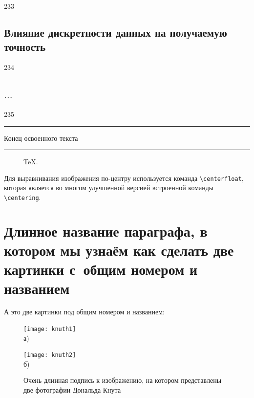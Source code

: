 233



\subsection{Влияние дискретности данных на получаемую точность}\label{subsec:ch2/sec3/sub4}

234



\subsection{$\ldots$}\label{subsec:ch2/sec3/sub5}

235


















\vfill
\noindent\rule{\textwidth}{.1pt}
\begin{center}				Конец освоенного текста					\end{center}
\noindent\rule{\textwidth}{1pt}
\newpage
\newpage



\begin{figure}[ht]
    \caption{TeX.}\label{fig:latex}
\end{figure}

Для выравнивания изображения по-центру используется команда \verb+\centerfloat+, которая является во
многом улучшенной версией встроенной команды \verb+\centering+.

\section{Длинное название параграфа, в котором мы узнаём как сделать две картинки с~общим номером и названием}\label{sec:ch2/sect2}

А это две картинки под общим номером и названием:
\begin{figure}[ht]
    \begin{minipage}[b][][b]{0.49\linewidth}\centering
        \texttt{[image: knuth1]} \\ а)
    \end{minipage}
    \hfill
    \begin{minipage}[b][][b]{0.49\linewidth}\centering
        \texttt{[image: knuth2]} \\ б)
    \end{minipage}
    \caption{Очень длинная подпись к изображению,
        на котором представлены две фотографии Дональда Кнута}
    \label{fig:knuth}
\end{figure}

